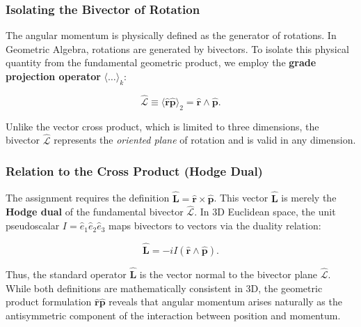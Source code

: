 \subsubsection{Isolating the Bivector of Rotation}
The angular momentum is physically defined as the generator of rotations. In Geometric Algebra, rotations are generated by bivectors. To isolate this physical quantity from the fundamental geometric product, we employ the \textbf{grade projection operator} $\langle \dots \rangle_k$:

\begin{equation}
    \hat{\mathcal{L}} \equiv \langle \hat{\mathbf{r}}\hat{\mathbf{p}} \rangle_2 = \hat{\mathbf{r}} \wedge \hat{\mathbf{p}}.
\end{equation}

Unlike the vector cross product, which is limited to three dimensions, the bivector $\hat{\mathcal{L}}$ represents the \textit{oriented plane} of rotation and is valid in any dimension.

\subsubsection{Relation to the Cross Product (Hodge Dual)}
The assignment requires the definition $\hat{\mathbf{L}} = \hat{\mathbf{r}} \times \hat{\mathbf{p}}$. This vector $\hat{\mathbf{L}}$ is merely the \textbf{Hodge dual} of the fundamental bivector $\hat{\mathcal{L}}$. In 3D Euclidean space, the unit pseudoscalar $I = \hat{e}_1 \hat{e}_2 \hat{e}_3$ maps bivectors to vectors via the duality relation:

\begin{equation}
    \hat{\mathbf{L}} = -i I (\hat{\mathbf{r}} \wedge \hat{\mathbf{p}}).
\end{equation}

Thus, the standard operator $\hat{\mathbf{L}}$ is the vector normal to the bivector plane $\hat{\mathcal{L}}$. While both definitions are mathematically consistent in 3D, the geometric product formulation $\hat{\mathbf{r}}\hat{\mathbf{p}}$ reveals that angular momentum arises naturally as the antisymmetric component of the interaction between position and momentum.